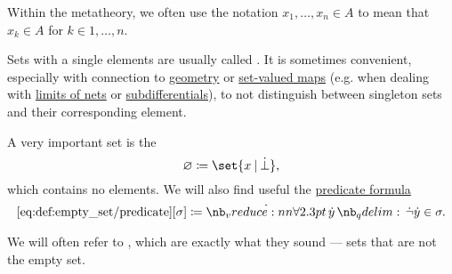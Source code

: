 \begin{remark}\label{rem:multiple_set_membership_shorthand}
  Within the metatheory, we often use the notation \( x_1, \ldots, x_n \in A \) to mean that \( x_k \in A \) for \( k \in 1, \ldots, n \).
\end{remark}

\begin{remark}\label{rem:singleton_sets}
  Sets with a single elements are usually called . It is sometimes convenient, especially with connection to \hyperref[ch:geometry]{geometry} or \hyperref[def:function]{set-valued maps} (e.g. when dealing with \hyperref[def:net_limit_point]{limits of nets} or \hyperref[def:subdifferentials]{subdifferentials}), to not distinguish between singleton sets and their corresponding element.
\end{remark}

\begin{definition}\label{def:empty_set}
  A very important set is the 
  \begin{equation*}
    \varnothing \coloneqq \set{ x \given \synbot },
  \end{equation*}
  which contains no elements. We will also find useful the \hyperref[con:predicate_formula]{predicate formula}
  \begin{equation*}\taglabel[\op{IsEmpty}]{eq:def:empty_set/predicate}
    \ref{eq:def:empty_set/predicate}[\sigma] \coloneqq \qforall \syny \synneg \syny \in \sigma.
  \end{equation*}

  We will often refer to , which are exactly what they sound --- sets that are not the empty set.
\end{definition}

